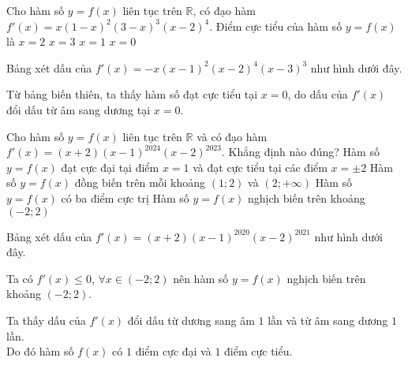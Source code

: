 \begin{ex}%
 Cho hàm số $y=f(x)$ liên tục trên $\mathbb{R}$, có đạo hàm $f'(x)=x(1-x)^2(3-x)^3(x-2)^4$. Điểm cực tiểu của hàm số $y=f(x)$ là
 \choice
 {$x=2$}
 {$x=3$}
 {$x=1$}
 {\True $x=0$}
 \loigiai
 {
 Bảng xét dấu của $f'(x)=-x(x-1)^2(x-2)^4(x-3)^3$ như hình dưới đây.
 \begin{center}
 \end{center}
 Từ bảng biến thiên, ta thấy hàm số đạt cực tiểu tại $x=0$, do dấu của $f'(x)$ đổi dấu từ âm sang dương tại $x=0$.
 }
\end{ex}
\begin{ex}%
 Cho hàm số $y=f(x)$ liên tục trên $\mathbb{R}$ và có đạo hàm $f'(x)=(x+2)(x-1)^{2024}(x-2)^{2023}$. Khẳng định nào đúng?
 \choice
 {Hàm số $y=f(x)$ đạt cực đại tại điểm $x=1$ và đạt cực tiểu tại các điểm $x=\pm2$}
 {Hàm số $y=f(x)$ đồng biến trên mỗi khoảng $(1;2)$ và $(2;+\infty)$}
 {Hàm số $y=f(x)$ có ba điểm cực trị}
 {\True Hàm số $y=f(x)$ nghịch biến trên khoảng $(-2;2)$}
 \loigiai
 {
 Bảng xét dấu của $f'(x)=(x+2)(x-1)^{2020}(x-2)^{2021}$ như hình dưới đây.
 \begin{center}
 \end{center}
 Ta có $f'(x)\le0$, $\forall x\in(-2;2)$ nên hàm số $y=f(x)$ nghịch biến trên khoảng $(-2;2)$.
 }
\end{ex}
\begin{ex}%
 {
 }
 \loigiai
 {
 Ta thấy dấu của $f'(x)$ đổi dấu từ dương sang âm $1$ lần và từ âm sang dương $1$ lần.\\
 Do đó hàm số $f(x)$ có $1$ điểm cực đại và $1$ điểm cực tiểu.
 }
\end{ex}
